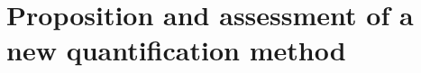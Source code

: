 \cleardoublepage
\part{Proposition and assessment of a new quantification method}\label{part:part3}






\newpage

